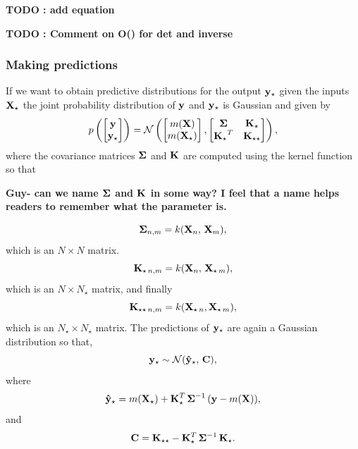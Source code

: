 {\bf TODO : add equation}

{\bf TODO : Comment on O() for det and inverse}

\subsubsection{Making predictions}
If we want to obtain predictive distributions for the output $\bf y_{\star}$ given the inputs $\bf X_{\star}$ the joint probability distribution of $\bf y$ and $\bf y_{\star}$ is Gaussian and given by
\begin{equation}
p \left( \begin{bmatrix} {\bf y} \\ {\bf y_{\star}} \end{bmatrix} \right) = \mathcal{N} \left( \begin{bmatrix} m({\bf X}) \\ m({\bf X_{\star}}) \end{bmatrix} , \begin{bmatrix} {\bf \Sigma} & {\bf K_{\star} }\\ {\bf K_{\star}}^{T} & {\bf K_{\star \star}} \end{bmatrix}  \right), 
\end{equation}
where the covariance matrices $\bf \Sigma$ and $\bf K$ are computed using the kernel function so that

{\bf Guy- can we name $\bf \Sigma$ and $\bf K$ in some way? I feel that a name helps readers to remember what the parameter is.}

\begin{equation}
{\bf \Sigma}_{n, m} = k({\bf X}_{n}, \, {\bf X}_{m}),
\end{equation}
which is an $N \times N$ matrix.
\begin{equation}
{\bf K}_{\star \, n, m} = k({\bf X}_{n}, \, { \bf X}_{\star \, m}),
\end{equation}
which is an $N \times N_{\star}$ matrix, and finally
\begin{equation}
{\bf K}_{\star \star \, n, m} = k({\bf X}_{\star \, n},  {\bf X}_{\star \,m}),
\end{equation}
which is an $N_{\star} \times N_{\star}$ matrix.
The predictions of $\bf y_{\star}$ are again a Gaussian distribution so that,
\begin{equation}
{\bf y}_{\star} \sim \mathcal{N}(\bf \hat{y}_{\star}, \, \bf C),
\label{eq:pred}
\end{equation}
where 
\begin{equation}
{\bf \hat{y}}_{\star} = m({\bf X}_{\star}) + {\bf K}_{\star}^{T} \, {\bf \Sigma}^{-1} \, ({\bf y} - m(\bf X)),
\end{equation}
and 
\begin{equation}
{\bf C} = {\bf K}_{\star \star} - {\bf K}_{\star}^{T} \, {\bf \Sigma}^{-1} \, {\bf K_{\star}}.
\end{equation}

